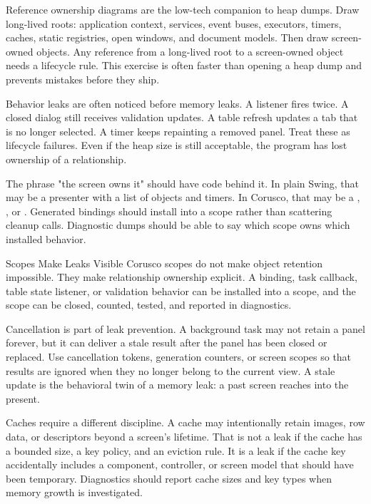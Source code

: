 Reference ownership diagrams are the low-tech companion to heap dumps. Draw long-lived roots: application context, services, event buses, executors, timers, caches, static registries, open windows, and document models. Then draw screen-owned objects. Any reference from a long-lived root to a screen-owned object needs a lifecycle rule. This exercise is often faster than opening a heap dump and prevents mistakes before they ship.

Behavior leaks are often noticed before memory leaks. A listener fires twice. A closed dialog still receives validation updates. A table refresh updates a tab that is no longer selected. A timer keeps repainting a removed panel. Treat these as lifecycle failures. Even if the heap size is still acceptable, the program has lost ownership of a relationship.

The phrase "the screen owns it" should have code behind it. In plain Swing, that may be a presenter with a list of  objects and timers. In Corusco, that may be a , , or . Generated bindings should install into a scope rather than scattering cleanup calls. Diagnostic dumps should be able to say which scope owns which installed behavior.

\begin{coruscobox}{Scopes Make Leaks Visible}
Corusco scopes do not make object retention impossible. They make relationship ownership explicit. A binding, task callback, table state listener, or validation behavior can be installed into a scope, and the scope can be closed, counted, tested, and reported in diagnostics.
\end{coruscobox}

Cancellation is part of leak prevention. A background task may not retain a panel forever, but it can deliver a stale result after the panel has been closed or replaced. Use cancellation tokens, generation counters, or screen scopes so that results are ignored when they no longer belong to the current view. A stale update is the behavioral twin of a memory leak: a past screen reaches into the present.

Caches require a different discipline. A cache may intentionally retain images, row data, or descriptors beyond a screen's lifetime. That is not a leak if the cache has a bounded size, a key policy, and an eviction rule. It is a leak if the cache key accidentally includes a component, controller, or screen model that should have been temporary. Diagnostics should report cache sizes and key types when memory growth is investigated.


